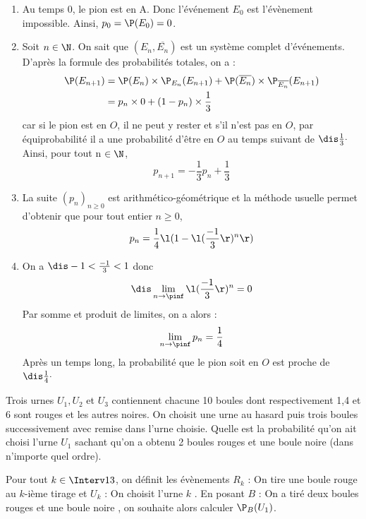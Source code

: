 \documentclass[a4paper,10pt]{report}
\begin{document}
\corr \begin{enumerate}
\item Au temps 0, le pion est en A. Donc l'événement $E_0$ est l'évènement impossible. Ainsi, $p_0=\P(E_0)=0$.

\item Soit $n\in \N$. On sait que $(E_n, \overline{E_n})$ est un système complet d'événements. D'après la formule des probabilités totales, on a :
\begin{align*}
 \P(E_{n+1}) &= \P(E_n) \times \P_{E_n}(E_{n+1}) + \P(\overline{E_n}) \times \P_{\overline{E_n}}(E_{n+1})\\
 &= p_n \times 0 + (1-p_n) \times \frac 13
\end{align*}
car si le pion est en $O$, il ne peut y rester et s'il n'est pas en $O$, par équiprobabilité il a une probabilité d'être en $O$ au temps suivant de $\dis \frac 13 \cdot$ Ainsi, pour tout n $\in \N$, 
$$p_{n+1} = -\frac 13 p_n + \frac 13$$

\item La suite $(p_n)_{n \geq 0}$ est arithmético-géométrique et la méthode usuelle permet d'obtenir que pour tout entier $n \geq 0$,
$$ p_n = \frac 14 \l( 1 - \l(\frac{-1}{3}\r)^n\r) $$
\item On a $\dis -1 < \frac{-1}{3}<1$ donc 
$$\dis \lim_{n\to \pinf} \l(\frac{-1}{3}\r)^n = 0$$
Par somme et produit de limites, on a alors :
\[ \lim_{n\to \pinf} p_n = \frac 14 \]
Après un temps long, la probabilité que le pion soit en $O$ est proche de $ \dis \frac 14 \cdot$
\end{enumerate}


\begin{Exercice}{} Trois urnes $U_1, U_2 $ et $U_3$ contiennent chacune 10 boules dont respectivement 1,4 et 6 sont rouges et les autres noires. On choisit une urne au hasard puis trois boules successivement avec remise dans l'urne choisie. Quelle est la probabilité qu'on ait choisi l'urne $U_1$ sachant qu'on a obtenu 2 boules rouges et une boule noire (dans n'importe quel ordre).
\end{Exercice}

\corr Pour tout $k \in \Interv13$, on définit les évènements $R_k$ : \og On tire une boule rouge au $k$-ième tirage \fg et $U_k$ : \og On choisit l'urne $k$ \fg . En posant $B$ : \og On a tiré deux boules rouges et une boule noire \fg , on souhaite  alors calculer $\P_B(U_1)$.

\vspace{0.2cm}
\end{document}
